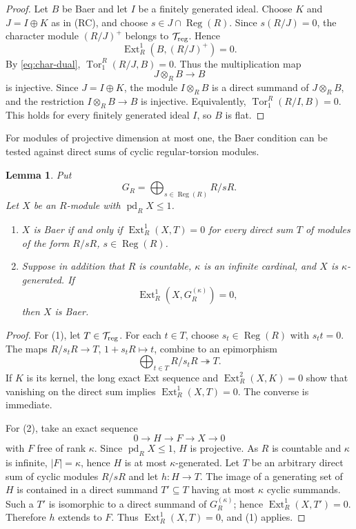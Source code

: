 \documentclass[11pt]{article}
\newtheorem{lemma}[lemma]{Lemma}
\theoremstyle{definition}
\theoremstyle{remark}
\newcommand{\Reg}{\operatorname{Reg}}
\newcommand{\pd}{\operatorname{pd}}
\newcommand{\Tor}{\operatorname{Tor}}
\newcommand{\Ext}{\operatorname{Ext}}
\newcommand{\Tors}{\mathcal T_{\rm reg}}
\begin{document}
\begin{proof}
Let $B$ be Baer and let $I$ be a finitely generated ideal.  Choose $K$ and
$J=I\oplus K$ as in (RC), and choose $s\in J\cap\Reg(R)$.  Since $s(R/J)=0$,
the character module $(R/J)^+$ belongs to $\Tors$.  Hence
\[
 \Ext_R^1(B,(R/J)^+)=0.
\]
By \eqref{eq:char-dual}, $\Tor_1^R(R/J,B)=0$.  Thus the multiplication map
\[
 J\otimes_RB\longrightarrow B
\]
is injective.  Since $J=I\oplus K$, the module $I\otimes_RB$ is a direct
summand of $J\otimes_RB$, and the restriction
$I\otimes_RB\to B$ is injective.  Equivalently,
$\Tor_1^R(R/I,B)=0$.  This holds for every finitely generated ideal $I$, so
$B$ is flat.
\end{proof}

For modules of projective dimension at most one, the Baer condition can be
tested against direct sums of cyclic regular-torsion modules.

\begin{lemma}\label{lem:test}
Put
\[
 G_R=\bigoplus_{s\in\Reg(R)}R/sR.
\]
Let $X$ be an $R$-module with $\pd_RX\le 1$.
\begin{enumerate}[label=\textup{(\arabic*)}]
\item $X$ is Baer if and only if
$\Ext_R^1(X,T)=0$ for every direct sum $T$ of modules of the form $R/sR$,
$s\in\Reg(R)$.
\item Suppose in addition that $R$ is countable, $\kappa$ is an infinite
cardinal, and $X$ is $\kappa$-generated.  If
\[
 \Ext_R^1(X,G_R^{(\kappa)})=0,
\]
then $X$ is Baer.
\end{enumerate}
\end{lemma}

\begin{proof}
For (1), let $T\in\Tors$.  For each $t\in T$, choose $s_t\in\Reg(R)$ with
$s_tt=0$.  The maps $R/s_tR\to T$, $1+s_tR\mapsto t$, combine to an
epimorphism
\[
 \bigoplus_{t\in T}R/s_tR\twoheadrightarrow T.
\]
If $K$ is its kernel, the long exact Ext sequence and $\Ext_R^2(X,K)=0$ show
that vanishing on the direct sum implies $\Ext_R^1(X,T)=0$.  The converse is
immediate.

For (2), take an exact sequence
\[
 0\longrightarrow H\longrightarrow F\longrightarrow X\longrightarrow0
\]
with $F$ free of rank $\kappa$.  Since $\pd_RX\le1$, $H$ is projective.  As
$R$ is countable and $\kappa$ is infinite, $|F|=\kappa$, hence $H$ is at most
$\kappa$-generated.  Let $T$ be an arbitrary direct sum of cyclic modules
$R/sR$ and let $h:H\to T$.  The image of a generating set of $H$ is contained
in a direct summand $T'\subseteq T$ having at most $\kappa$ cyclic summands.
Such a $T'$ is isomorphic to a direct summand of $G_R^{(\kappa)}$; hence
$\Ext_R^1(X,T')=0$.  Therefore $h$ extends to $F$.  Thus
$\Ext_R^1(X,T)=0$, and (1) applies.
\end{proof}
\end{document}
